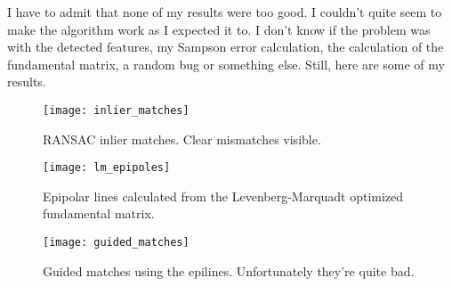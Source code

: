 I have to admit that none of my results were too good. I couldn't quite seem to
make the algorithm work as I expected it to. I don't know if the problem was
with the detected features, my Sampson error calculation, the calculation of
the fundamental matrix, a random bug or something else. Still, here are some of
my results.

\begin{figure}[h]
  \centering
  \texttt{[image: inlier\_matches]}
  \caption{RANSAC inlier matches. Clear mismatches visible.}\label{fig:}
\end{figure}

\begin{figure}[h]
  \centering
  \texttt{[image: lm\_epipoles]}
  \caption{Epipolar lines calculated from the Levenberg-Marquadt optimized
  fundamental matrix.}\label{fig:}
\end{figure}

\begin{figure}[h]
  \centering
  \texttt{[image: guided\_matches]}
  \caption{Guided matches using the epilines. Unfortunately they're quite bad.}\label{fig:}
\end{figure}
